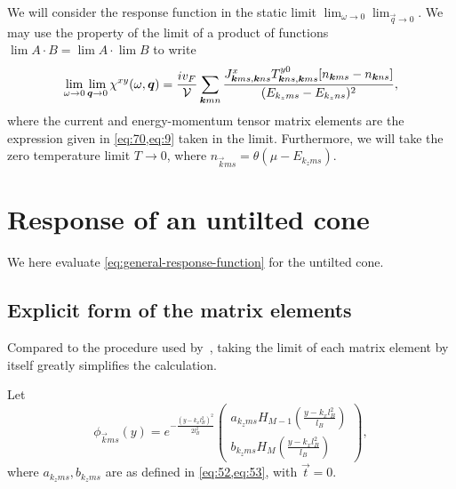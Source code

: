 We will consider the response function in the static limit \( \lim_{\omega \to 0} \lim_{\vec{q} \to 0} \).
We may use the property of the limit of a product of functions \( \lim A\cdot B = \lim A \cdot \lim B \) to write
\begin{equation}
  \label{eq:general-response-function}
  \lim_{\omega \to 0} \lim_{\vec{q} \to 0} \chi^{xy}(\omega, \vec{q}) = \frac{i v_F }{\mathcal{V}} \sum\limits_{\vec{k} m n}^{}
  \frac{
    J^x_{\vec{k} m s, \vec{k} n s} T^{y 0}_{\vec{k} n s, \vec{k} m s} [n_{\vec{k} m s} - n_{\vec{k} n s}]
  }{
    (E_{k_z m s} - E_{k_z n s})^2
  },
\end{equation}
where the current and energy-momentum tensor matrix elements are the expression given in \cref{eq:70,eq:9} taken in the limit.
Furthermore, we will take the zero temperature limit \( T\to 0 \), where \( n_{\vec{k} m s} = \theta(\mu - E_{k_z m s}) \).


\section{Response of an untilted cone}
We here evaluate \cref{eq:general-response-function} for the untilted cone.

\subsection{Explicit form of the matrix elements}\label{sec:notilt:explicit}
Compared to the procedure used by~\textcite{arjonaFingerprintsConformalAnomaly2019}, taking the limit of each matrix element by itself greatly simplifies the calculation.

Let
\begin{equation}
  \label{eq:72}
  \phi _{\vec{k}ms}(y)
  = e^{-\frac{(y-k_xl_B^2)^2}{2 l_{B}^2}}
  \begin{pmatrix}
    a_{k_zms} H_{M-1} \left( \frac{y - k_xl_B^2}{l_B} \right)\\
    b_{k_zms} H_M \left( \frac{y - k_xl_B^2}{l_B} \right)
  \end{pmatrix},
\end{equation}
where \( a_{k_z m s}, b_{k_z m s} \) are as defined in \cref{eq:52,eq:53}, with \( \vec{t}=0 \).



